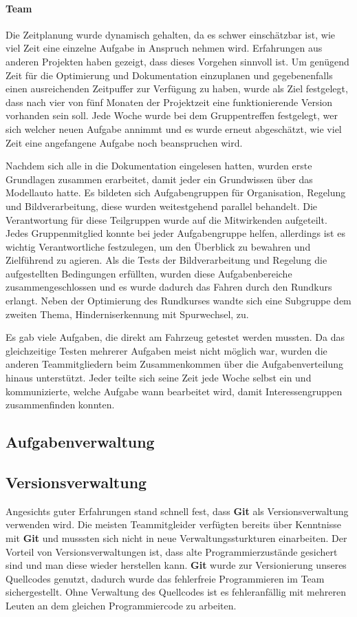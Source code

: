 \paragraph{Team}

Die Zeitplanung wurde dynamisch gehalten, da es schwer einschätzbar ist, wie viel Zeit eine einzelne Aufgabe in Anspruch nehmen wird. Erfahrungen aus anderen Projekten haben gezeigt, dass dieses Vorgehen sinnvoll ist. Um genügend Zeit für die Optimierung und Dokumentation einzuplanen und gegebenenfalls einen ausreichenden Zeitpuffer zur Verfügung zu haben, wurde als Ziel festgelegt, dass nach vier von fünf Monaten der Projektzeit eine funktionierende Version vorhanden sein soll. Jede Woche wurde bei dem Gruppentreffen festgelegt, wer sich welcher neuen Aufgabe annimmt und es wurde erneut abgeschätzt, wie viel Zeit eine angefangene Aufgabe noch beanspruchen wird.


Nachdem sich alle in die Dokumentation eingelesen hatten, wurden erste Grundlagen zusammen erarbeitet, damit jeder ein Grundwissen über das Modellauto hatte. Es bildeten sich Aufgabengruppen für Organisation, Regelung und Bildverarbeitung, diese wurden weitestgehend parallel behandelt. Die Verantwortung für diese Teilgruppen wurde auf die Mitwirkenden aufgeteilt. Jedes Gruppenmitglied konnte bei jeder Aufgabengruppe helfen, allerdings ist es wichtig Verantwortliche festzulegen, um den Überblick zu bewahren und Zielführend zu agieren. Als die Tests der Bildverarbeitung und Regelung die aufgestellten Bedingungen erfüllten, wurden diese Aufgabenbereiche zusammengeschlossen und es wurde dadurch das Fahren durch den Rundkurs erlangt. Neben der Optimierung des Rundkurses wandte sich eine Subgruppe dem zweiten Thema, Hinderniserkennung mit Spurwechsel, zu.

Es gab viele Aufgaben, die direkt am Fahrzeug getestet werden mussten. Da das gleichzeitige Testen mehrerer Aufgaben meist nicht möglich war, wurden die anderen Teammitgliedern beim Zusammenkommen über die Aufgabenverteilung hinaus unterstützt. Jeder teilte sich seine Zeit jede Woche selbst ein und kommunizierte, welche Aufgabe wann bearbeitet wird, damit Interessengruppen zusammenfinden konnten. 

\subsection{Aufgabenverwaltung}
\label{sec:aufgabenverwaltung}


\subsection{Versionsverwaltung}
\label{sec:versionsverwaltung}
Angesichts guter Erfahrungen stand schnell fest, dass \textbf{Git} als Versionsverwaltung verwenden wird. Die meisten Teammitgleider verfügten bereits über Kenntnisse mit \textbf{Git} und musssten sich nicht in neue Verwaltungssturkturen einarbeiten. Der Vorteil von Versionsverwaltungen ist, dass alte Programmierzustände gesichert sind und man diese wieder herstellen kann. \textbf{Git} wurde zur Versionierung unseres Quellcodes genutzt, dadurch wurde das fehlerfreie Programmieren im Team sichergestellt. Ohne Verwaltung des Quellcodes ist es fehleranfällig  mit mehreren Leuten an dem gleichen Programmiercode zu arbeiten. 